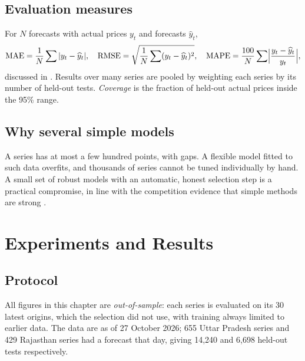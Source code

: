 \documentclass[12pt,a4paper,oneside]{report}
\numberwithin{equation}{chapter}
\numberwithin{figure}{chapter}
\numberwithin{table}{chapter}
\theoremstyle{definition}
\newcommand{\hatt}[1]{\widehat{#1}}
\begin{document}
\section{Evaluation measures}
For $N$ forecasts with actual prices $y_t$ and forecasts $\hatt{y}_t$,
\begin{equation}
  \mathrm{MAE}=\frac1N\sum|y_t-\hatt{y}_t|,\quad
  \mathrm{RMSE}=\sqrt{\frac1N\sum(y_t-\hatt{y}_t)^2},\quad
  \mathrm{MAPE}=\frac{100}{N}\sum\Bigl|\frac{y_t-\hatt{y}_t}{y_t}\Bigr|,
\end{equation}
discussed in \cite{hyndman2006}. Results over many series are pooled by weighting each series by its number of held-out tests. \emph{Coverage} is the fraction of held-out actual prices inside the 95\% range.

\section{Why several simple models}
A series has at most a few hundred points, with gaps. A flexible model fitted to such data overfits, and thousands of series cannot be tuned individually by hand. A small set of robust models with an automatic, honest selection step is a practical compromise, in line with the competition evidence that simple methods are strong \cite{makridakis2020}.

\chapter{Experiments and Results}

\section{Protocol}
All figures in this chapter are \emph{out-of-sample}: each series is evaluated on its 30 latest origins, which the selection did not use, with training always limited to earlier data. The data are as of 27 October 2026; 655 Uttar Pradesh series and 429 Rajasthan series had a forecast that day, giving 14{,}240 and 6{,}698 held-out tests respectively.
\end{document}
